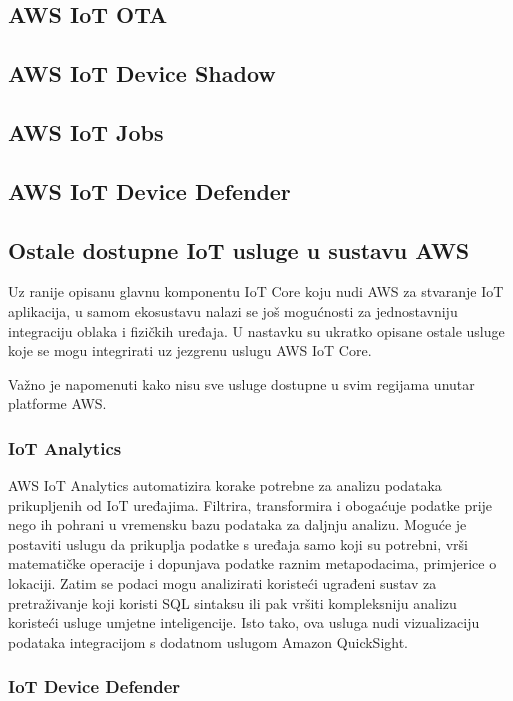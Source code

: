 \subsection{AWS IoT OTA}

\subsection{AWS IoT Device Shadow}

\subsection{AWS IoT Jobs}

\subsection{AWS IoT Device Defender}

\subsection{Ostale dostupne IoT usluge u sustavu AWS}

Uz ranije opisanu glavnu komponentu IoT Core koju nudi AWS za stvaranje IoT aplikacija, u samom ekosustavu nalazi se još mogućnosti za jednostavniju integraciju oblaka i fizičkih uređaja. U nastavku su ukratko opisane ostale usluge koje se mogu integrirati uz jezgrenu uslugu AWS IoT Core.

Važno je napomenuti kako nisu sve usluge dostupne u svim regijama unutar platforme AWS.

\subsubsection{IoT Analytics}

AWS IoT Analytics automatizira korake potrebne za analizu podataka prikupljenih od IoT uređajima. Filtrira, transformira i obogaćuje podatke prije nego ih pohrani u vremensku bazu podataka za daljnju analizu. Moguće je postaviti uslugu da prikuplja podatke s uređaja samo koji su potrebni, vrši matematičke operacije i dopunjava podatke raznim metapodacima, primjerice o lokaciji. Zatim se podaci mogu analizirati koristeći ugrađeni sustav za pretraživanje koji koristi SQL sintaksu ili pak vršiti kompleksniju analizu koristeći usluge umjetne inteligencije. Isto tako, ova usluga nudi vizualizaciju podataka integracijom s dodatnom uslugom Amazon QuickSight. 

\subsubsection{IoT Device Defender}

